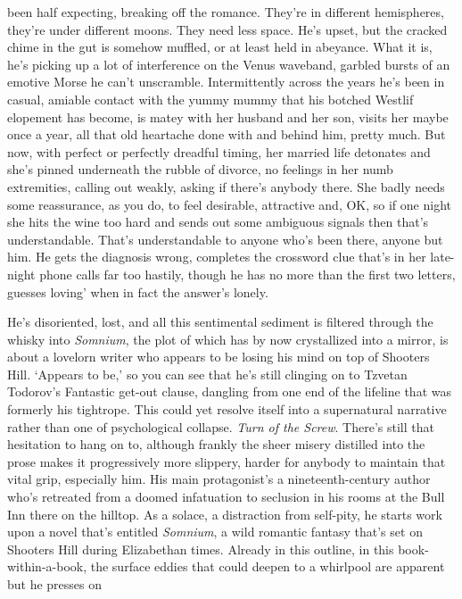 \documentclass[
]{article}
\begin{document}
been half expecting, breaking off the romance. They're in different
hemispheres, they're under different moons. They need less space. He's
upset, but the cracked chime in the gut is somehow muffled, or at least
held in abeyance. What it is, he's picking up a lot of interference on
the Venus waveband, garbled bursts of an emotive Morse he can't
unscramble. Intermittently across the years he's been in casual, amiable
contact with the yummy mummy that his botched Westlif elopement has
become, is matey with her husband and her son, visits her maybe once a
year, all that old heartache done with and behind him, pretty much. But
now, with perfect or perfectly dreadful timing, her married life
detonates and she's pinned underneath the rubble of divorce, no feelings
in her numb extremities, calling out weakly, asking if there's anybody
there. She badly needs some reassurance, as you do, to feel desirable,
attractive and, OK, so if one night she hits the wine too hard and sends
out some ambiguous signals then that's understandable. That's
understandable to anyone who's been there, anyone but him. He gets the
diagnosis wrong, completes the crossword clue that's in her late-night
phone calls far too hastily, though he has no more than the first two
letters, guesses loving' when in fact the answer's lonely. \par
 He's disoriented, lost, and all this sentimental sediment is
filtered through the whisky into \emph{Somnium}, the plot of which has
by now crystallized into a mirror, is about a lovelorn writer who
appears to be losing his mind on top of Shooters Hill. `Appears to be,'
so you can see that he's still clinging on to Tzvetan Todorov's
Fantastic get-out clause, dangling from one end of the lifeline that was
formerly his tightrope. This could yet resolve itself into a
supernatural narrative rather than one of psychological collapse.
\emph{Turn of the Screw}. There's still that hesitation to hang on to,
although frankly the sheer misery distilled into the prose makes it
progressively more slippery, harder for anybody to maintain that vital
grip, especially him. His main protagonist's a nineteenth-century author
who's retreated from a doomed infatuation to seclusion in his rooms at
the Bull Inn there on the hilltop. As a solace, a distraction from
self-pity, he starts work upon a novel that's entitled \emph{Somnium}, a
wild romantic fantasy that's set on Shooters Hill during Elizabethan
times. Already in this outline, in this book-within-a-book, the surface
eddies that could deepen to a whirlpool are apparent but he presses on
\end{document}
